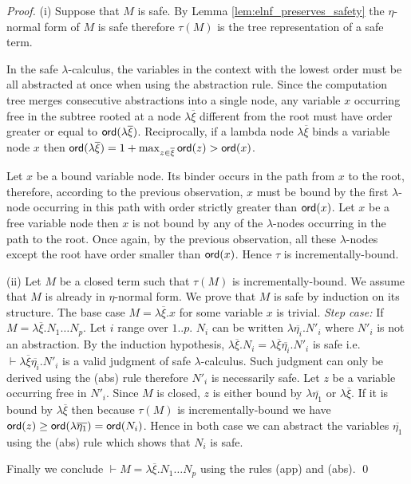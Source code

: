 \documentclass{llncs}
\newcommand\ord[1]{{\sf ord}(#1)}
\begin{document}
\begin{proof}
(i) Suppose that $M$ is safe. By Lemma \ref{lem:elnf_preserves_safety}
the $\eta$-normal form of $M$ is safe therefore $\tau(M)$ is the tree representation of a safe term.

In the safe $\lambda$-calculus, the variables in the context with the lowest order must be all abstracted
at once when using the abstraction rule. Since the computation
tree merges consecutive abstractions into a single node,
any variable $x$ occurring free in the subtree rooted at a node $\lambda \overline{\xi}$ different from the root
must have order greater or equal to $\ord{\lambda \overline{\xi}}$. Reciprocally, if a lambda node
$\lambda \overline{\xi}$ binds a variable node $x$ then
$\ord{\lambda \overline{\xi}} = 1+\max_{z\in\overline{\xi}} \ord{z} > \ord{x}$.

Let $x$ be a bound variable node. Its binder occurs in the path from $x$
to the root, therefore, according to the previous observation, $x$ must be bound
by the first $\lambda$-node occurring in this path with order strictly
greater than $\ord{x}$. Let $x$ be a free variable node then $x$ is not bound
by any of the $\lambda$-nodes occurring in the path to the root. Once again, by the previous observation, all
these $\lambda$-nodes except the root have order smaller than $\ord{x}$. Hence
$\tau$ is incrementally-bound.

(ii) Let $M$ be a closed term such that $\tau(M)$ is incrementally-bound.
We assume that $M$ is already in $\eta$-normal form.
We prove that $M$ is safe by induction on its structure. The base case $M =
\lambda \overline{\xi} . x$ for some variable $x$ is trivial.
\emph{Step case:} If $M = \lambda \overline{\xi} . N_1 \ldots N_p$.
Let $i$ range over $1..p$. $N_i$ can be written $\lambda
\overline{\eta_i} . N'_i$ where $N'_i$ is not an abstraction. By the
induction hypothesis, $\lambda \overline{\xi} . N_i = \lambda
\overline{\xi} \overline{\eta_i} . N'_i$ is safe i.e.
$\vdash \lambda \overline{\xi} \overline{\eta_i} . N'_i$
is a valid judgment of safe $\lambda$-calculus.
Such judgment can only be derived using the (abs) rule therefore
$N'_i$ is necessarily safe. Let $z$ be a variable occurring free in
$N'_i$. Since $M$ is closed, $z$ is either bound by $\lambda
\overline{\eta_1}$ or $\lambda \overline{\xi}$. If it is bound by
$\lambda \overline{\xi}$ then because $\tau(M)$ is
incrementally-bound we have $\ord{z} \geq \ord{\lambda
\overline{\eta_1}} = \ord{N_i}$. Hence in both case we can abstract the variables
$\overline{\eta_1}$ using the (abs) rule which shows that $N_i$ is safe.

Finally we conclude $\vdash M = \lambda \overline{\xi} . N_1 \ldots N_p$ using the
rules (app) and (abs).
\qed
\end{proof}
\end{document}
